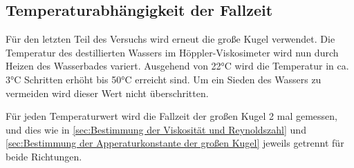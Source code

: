 \subsection{Temperaturabhängigkeit der Fallzeit}
\label{sec:Temperaturabhängigkeit der Fallzeit}
Für den letzten Teil des Versuchs wird erneut die große Kugel verwendet.
Die Temperatur des destillierten Wassers im Höppler-Viskosimeter wird nun durch Heizen des Wasserbades variert.
Ausgehend von 22°C wird die Temperatur in ca. 3°C Schritten erhöht bis 50°C erreicht sind. Um ein Sieden des
Wassers zu vermeiden wird dieser Wert nicht überschritten.

Für jeden Temperaturwert wird die Fallzeit der großen Kugel 2 mal gemessen,
und dies wie in \autoref{sec:Bestimmung der Viskosität und Reynoldszahl}
und \autoref{sec:Bestimmung der Apperaturkonstante der großen Kugel} jeweils getrennt für beide Richtungen.
